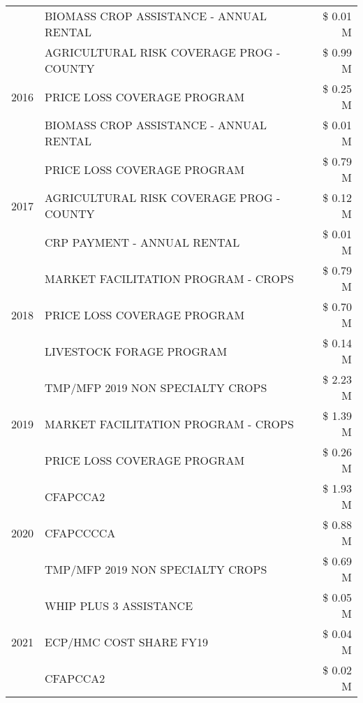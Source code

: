 \begin{tabular}{llr}
 & BIOMASS CROP ASSISTANCE - ANNUAL RENTAL & \$ 0.01 M \\
\cline{1-3}
\multirow[t]{3}{*}{2016} & AGRICULTURAL RISK COVERAGE PROG - COUNTY & \$ 0.99 M \\
 & PRICE LOSS COVERAGE PROGRAM & \$ 0.25 M \\
 & BIOMASS CROP ASSISTANCE - ANNUAL RENTAL & \$ 0.01 M \\
\cline{1-3}
\multirow[t]{3}{*}{2017} & PRICE LOSS COVERAGE PROGRAM & \$ 0.79 M \\
 & AGRICULTURAL RISK COVERAGE PROG - COUNTY & \$ 0.12 M \\
 & CRP PAYMENT - ANNUAL RENTAL & \$ 0.01 M \\
\cline{1-3}
\multirow[t]{3}{*}{2018} & MARKET FACILITATION PROGRAM - CROPS & \$ 0.79 M \\
 & PRICE LOSS COVERAGE PROGRAM & \$ 0.70 M \\
 & LIVESTOCK FORAGE PROGRAM & \$ 0.14 M \\
\cline{1-3}
\multirow[t]{3}{*}{2019} & TMP/MFP 2019 NON SPECIALTY CROPS & \$ 2.23 M \\
 & MARKET FACILITATION PROGRAM - CROPS & \$ 1.39 M \\
 & PRICE LOSS COVERAGE PROGRAM & \$ 0.26 M \\
\cline{1-3}
\multirow[t]{3}{*}{2020} & CFAPCCA2 & \$ 1.93 M \\
 & CFAPCCCCA & \$ 0.88 M \\
 & TMP/MFP 2019 NON SPECIALTY CROPS & \$ 0.69 M \\
\cline{1-3}
\multirow[t]{3}{*}{2021} & WHIP PLUS 3 ASSISTANCE & \$ 0.05 M \\
 & ECP/HMC COST SHARE FY19 & \$ 0.04 M \\
 & CFAPCCA2 & \$ 0.02 M \\
\cline{1-3}
\bottomrule
\end{tabular}

